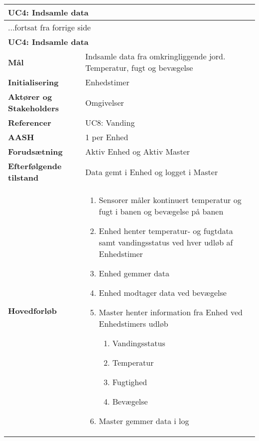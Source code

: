 \begin{center} \centering \label{UC4}
	\begin{longtable}{|p{5cm}|p{9cm}|}  %
	\hline
		\multicolumn{2}{|l|}{\textbf{UC4: Indsamle data}} \\\hline %
		\endfirsthead
		
		\multicolumn{2}{l}{...fortsat fra forrige side} \\ \hline %
		\multicolumn{2}{|l|}{\textbf{UC4: Indsamle data}} \\\hline %
		\endhead	
		
		\textbf{Mål}								&Indsamle data fra omkringliggende jord. Temperatur, fugt og bevægelse			\\\hline
		\textbf{Initialisering}					&Enhedstimer			\\\hline
		\textbf{Aktører og Stakeholders}			&Omgivelser				\\\hline
		\textbf{Referencer}						&UC8: Vanding		\\\hline
		\textbf{AASH}							&1 per Enhed			\\\hline
		\textbf{Forudsætning}					&Aktiv Enhed og Aktiv Master			\\\hline
		\textbf{Efterfølgende tilstand}			&Data gemt i Enhed og logget i Master 	\\\hline
		\textbf{Hovedforløb}					
			&\begin{enumerate}
	
				\item Sensorer måler kontinuert temperatur og fugt i banen og bevægelse på banen
				
				\item Enhed henter temperatur- og fugtdata samt vandingsstatus ved hver udløb af Enhedstimer
				
				\item Enhed gemmer data				
				
				\item Enhed modtager data ved bevægelse  
				
				\item Master henter information fra Enhed ved Enhedstimers udløb
				
				\begin{enumerate}
					\item Vandingsstatus
					\item Temperatur
					\item Fugtighed
					\item Bevægelse
				\end{enumerate}
				
				\item Master gemmer data i log
				
			\end{enumerate}\\\hline
	\end{longtable}
\end{center}

